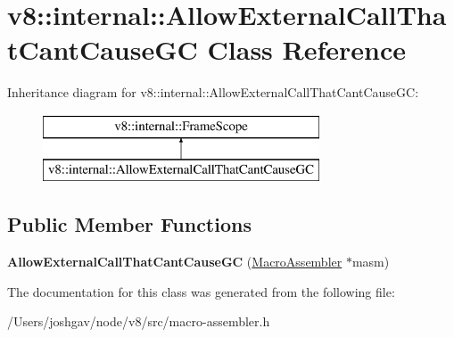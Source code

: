 \hypertarget{classv8_1_1internal_1_1_allow_external_call_that_cant_cause_g_c}{}\section{v8\+:\+:internal\+:\+:Allow\+External\+Call\+That\+Cant\+Cause\+GC Class Reference}
\label{classv8_1_1internal_1_1_allow_external_call_that_cant_cause_g_c}
Inheritance diagram for v8\+:\+:internal\+:\+:Allow\+External\+Call\+That\+Cant\+Cause\+GC\+:\begin{figure}[H]
\begin{center}
\leavevmode
\includegraphics[height=2.000000cm]{classv8_1_1internal_1_1_allow_external_call_that_cant_cause_g_c}
\end{center}
\end{figure}
\subsection*{Public Member Functions}
\begin{DoxyCompactItemize}
\item 
{\bfseries Allow\+External\+Call\+That\+Cant\+Cause\+GC} (\hyperlink{classv8_1_1internal_1_1_macro_assembler}{Macro\+Assembler} $\ast$masm)\hypertarget{classv8_1_1internal_1_1_allow_external_call_that_cant_cause_g_c_ae136159f715f0afd4a7f76629f7bca48}{}\label{classv8_1_1internal_1_1_allow_external_call_that_cant_cause_g_c_ae136159f715f0afd4a7f76629f7bca48}

\end{DoxyCompactItemize}


The documentation for this class was generated from the following file\+:\begin{DoxyCompactItemize}
\item 
/\+Users/joshgav/node/v8/src/macro-\/assembler.\+h\end{DoxyCompactItemize}
